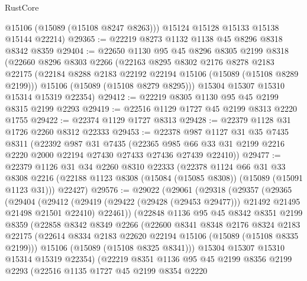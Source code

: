 \begin{lexlean}{RustCore}
\begin{coremodule}
        @15106
        (@15089 (@15108 @8247 @8263)))
      @15124
      @15128
      @15133
      @15138
      @15144
      @22214)
@29365 := @22219 @8273 @1132 @1138 @45 @8296 @8318 @8342 @8359
@29404 := @22650
    @1130
    @95
    @45
    @8296
    @8305
    @2199
    @8318
    (@22660
      @8296
      @8303
      @2266
      (@22163
        @8295
        @8302
        @2176
        @8278
        @2183
        @22175
        (@22184 @8288 @2183 @22192 @22194 @15106 (@15089 (@15108 @8289 @2199)))
        @15106
        (@15089 (@15108 @8279 @8295)))
      @15304
      @15307
      @15310
      @15314
      @15319
      @22354)
@29412 := @22219 @8305 @1130 @95 @45 @2199 @8315 @2199 @2293
@29419 := @22516 @1129 @1727 @45 @2199 @8313 @2220 @1755
@29422 := @22374 @1129 @1727 @8313
@29428 := @22379 @1128 @31 @1726 @2260 @8312 @22333
@29453 := @22378
    @987
    @1127
    @31
    @35
    @7435
    @8311
    (@22392
      @987
      @31
      @7435
      (@22365 @985 @66 @33 @31 @2199 @2216 @2220 @2000 @22194 @27430 @27433 @27436 @27439 @22410))
@29477 := @22379
    @1126
    @31
    @34
    @2260
    @8310
    @22333
    (@22378
      @1124
      @66
      @31
      @33
      @8308
      @2216
      (@22188 @1123 @8308 (@15084 (@15085 @8308)) (@15089 (@15091 @1123 @31)))
      @22427)
@29576 := @29022
    (@29061
      (@29318
        (@29357
          (@29365
            (@29404
              (@29412
                (@29419 (@29422 (@29428 (@29453 @29477))) @21492 @21495 @21498 @21501 @22410)
                @22461))
            (@22848
              @1136
              @95
              @45
              @8342
              @8351
              @2199
              @8359
              (@22858
                @8342
                @8349
                @2266
                (@22600
                  @8341
                  @8348
                  @2176
                  @8324
                  @2183
                  @22175
                  (@22614 @8334 @2183 @22620 @22194 @15106 (@15089 (@15108 @8335 @2199)))
                  @15106
                  (@15089 (@15108 @8325 @8341)))
                @15304
                @15307
                @15310
                @15314
                @15319
                @22354)
              (@22219
                @8351
                @1136
                @95
                @45
                @2199
                @8356
                @2199
                @2293
                (@22516
                  @1135
                  @1727
                  @45
                  @2199
                  @8354
                  @2220

\end{coremodule}
\end{lexlean}
